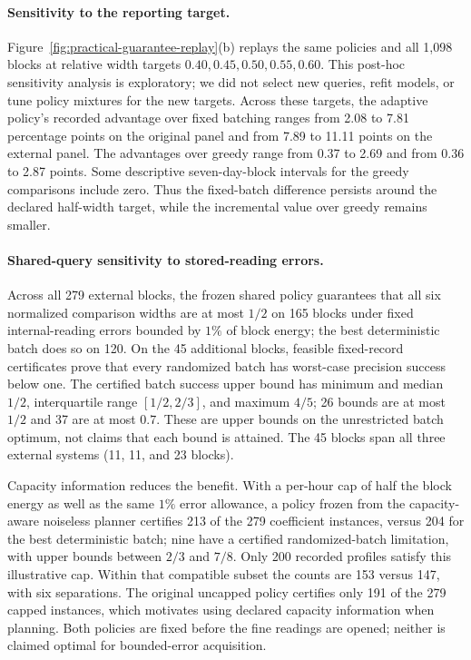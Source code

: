 \documentclass[12pt]{article}
\begin{document}
\paragraph{Sensitivity to the reporting target.}
Figure~\ref{fig:practical-guarantee-replay}(b) replays the same policies and
all 1,098 blocks at relative width targets
$0.40,0.45,0.50,0.55,0.60$. This post-hoc sensitivity analysis is exploratory; we did
not select new queries, refit models, or tune policy mixtures for the new targets.
Across these targets, the adaptive policy's recorded advantage over fixed
batching ranges from 2.08 to 7.81 percentage points on the original panel and
from 7.89 to 11.11 points on the external panel. The advantages over greedy
range from 0.37 to 2.69 and from 0.36 to 2.87 points. Some descriptive
seven-day-block intervals for the greedy comparisons include zero. Thus the
fixed-batch difference persists around the declared half-width target, while
the incremental value over greedy remains smaller.

\FloatBarrier
\paragraph{Shared-query sensitivity to stored-reading errors.}
Across all 279 external blocks, the frozen shared policy guarantees that
all six normalized comparison widths are at most $1/2$ on 165 blocks under
fixed internal-reading errors bounded by $1\%$ of block energy; the best
deterministic batch does so on 120.  On the 45 additional blocks,
feasible fixed-record certificates prove that every randomized batch has
worst-case precision success below one.  The certified batch success
upper bound has minimum and median $1/2$, interquartile range
$[1/2,2/3]$, and maximum $4/5$; 26 bounds are at most $1/2$ and 37 are
at most $0.7$.  These are upper bounds on the unrestricted batch optimum,
not claims that each bound is attained.  The 45 blocks span all three
external systems (11, 11, and 23 blocks).

Capacity information reduces the benefit.  With a per-hour cap of half
the block energy as well as the same $1\%$ error allowance, a policy
frozen from the capacity-aware noiseless planner certifies 213 of the
279 coefficient instances, versus 204 for the best deterministic batch;
nine have a certified randomized-batch limitation, with upper bounds
between $2/3$ and $7/8$.  Only 200 recorded profiles satisfy this illustrative
cap.  Within that compatible subset the counts are 153 versus 147, with
six separations.  The original uncapped policy certifies only 191 of the
279 capped instances, which motivates using declared capacity information
when planning.  Both policies are fixed before the fine readings are
opened; neither is claimed optimal for bounded-error acquisition.
\end{document}
